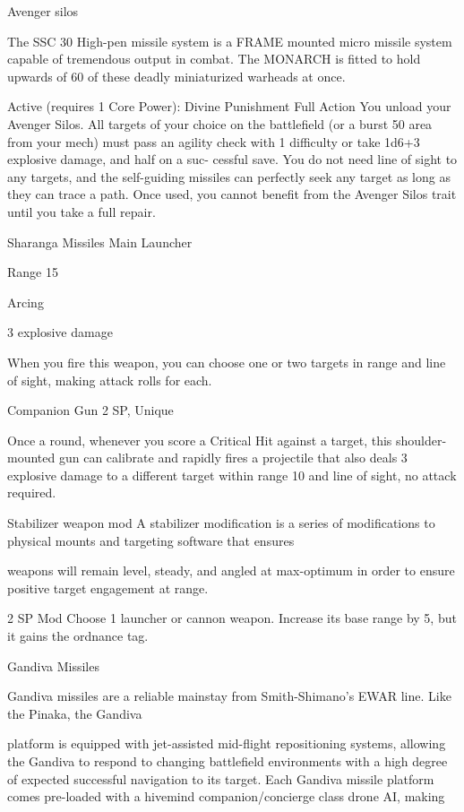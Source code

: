                                                   Avenger silos

  The SSC 30 High-pen missile system is a FRAME mounted micro missile system capable of tremendous
  output in combat. The MONARCH is fitted to hold upwards of 60 of these deadly miniaturized warheads
  at once.

  Active (requires 1 Core Power): Divine Punishment
   Full Action
  You unload your Avenger Silos. All targets of your choice on the battlefield (or a burst 50 area from your
  mech) must pass an agility check with 1 difficulty or take 1d6+3 explosive damage, and half on a suc-
  cessful save. You do not need line of sight to any targets, and the self-guiding missiles can perfectly
  seek any target as long as they can trace a path. Once used, you cannot benefit from the Avenger Silos
  trait until you take a full repair.




Sharanga Missiles
Main Launcher

Range 15

Arcing

3 explosive damage

When you fire this weapon, you can choose one or two targets in range and line of sight, making
attack rolls for each.


Companion Gun
2 SP, Unique

Once a round, whenever you score a Critical Hit against a target, this shoulder-mounted gun can
calibrate and rapidly fires a projectile that also deals 3 explosive damage to a different target
within range 10 and line of sight, no attack required.


Stabilizer weapon mod
A stabilizer modification is a series of modifications to physical mounts and targeting software that ensures

weapons will remain level, steady, and angled at max-optimum in order to ensure positive target
engagement at range.

2 SP
Mod
Choose 1 launcher or cannon weapon. Increase its base range by 5, but it gains the ordnance
tag.


Gandiva Missiles

Gandiva missiles are a reliable mainstay from Smith-Shimano’s EWAR line. Like the Pinaka, the Gandiva

platform is equipped with jet-assisted mid-flight repositioning systems, allowing the Gandiva to respond to
changing battlefield environments with a high degree of expected successful navigation to its target. Each
Gandiva missile platform comes pre-loaded with a hivemind companion/concierge class drone AI, making

